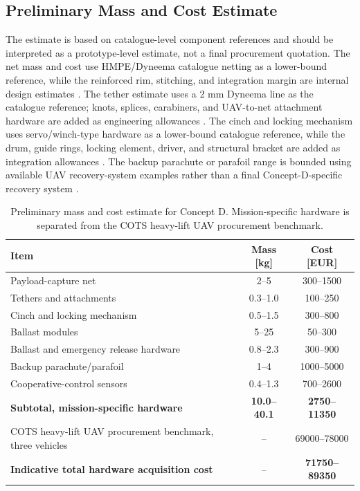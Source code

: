 \subsection{Preliminary Mass and Cost Estimate}

The estimate is based on catalogue-level component references and should be interpreted as a prototype-level estimate, not a final procurement quotation. The net mass and cost use HMPE/Dyneema catalogue netting as a lower-bound reference, while the reinforced rim, stitching, and integration margin are internal design estimates \cite{Netmark2026HMPE/DyneemaHM}. The tether estimate uses a 2 mm Dyneema line as the catalogue reference; knots, splices, carabiners, and UAV-to-net attachment hardware are added as engineering allowances \cite{Spearfishing.de2026DyneemaM}. The cinch and locking mechanism uses servo/winch-type hardware as a lower-bound catalogue reference, while the drum, guide rings, locking element, driver, and structural bracket are added as integration allowances \cite{FlashRC2026ServoTurns}. The backup parachute or parafoil range is bounded using available UAV recovery-system examples rather than a final Concept-D-specific recovery system \cite{MegaDron2026MOCSeries,UAVSystemsInternational2026DroneKg}.

\begin{table}[H]
\centering
\small
\caption{Preliminary mass and cost estimate for Concept D. Mission-specific hardware is separated from the COTS heavy-lift UAV procurement benchmark.}
\label{tab:conceptD_sizing_cost}
\setlength{\tabcolsep}{5pt}
\renewcommand{\arraystretch}{1.18}
\begin{tabularx}{0.95\textwidth}{@{}Xcc@{}}
\toprule
\textbf{Item} & \textbf{Mass [kg]} & \textbf{Cost [EUR]} \\
\midrule
Payload-capture net & 2--5 & 300--1500 \\
Tethers and attachments & 0.3--1.0 & 100--250 \\
Cinch and locking mechanism & 0.5--1.5 & 300--800 \\
Ballast modules & 5--25 & 50--300 \\
Ballast and emergency release hardware & 0.8--2.3 & 300--900 \\
Backup parachute/parafoil & 1--4 & 1000--5000 \\
Cooperative-control sensors & 0.4--1.3 & 700--2600 \\
\midrule
\textbf{Subtotal, mission-specific hardware} & \textbf{10.0--40.1} & \textbf{2750--11350} \\
\midrule
COTS heavy-lift UAV procurement benchmark, three vehicles & -- & 69000--78000 \\
\midrule
\textbf{Indicative total hardware acquisition cost} & -- & \textbf{71750--89350} \\
\bottomrule
\end{tabularx}
\end{table}

